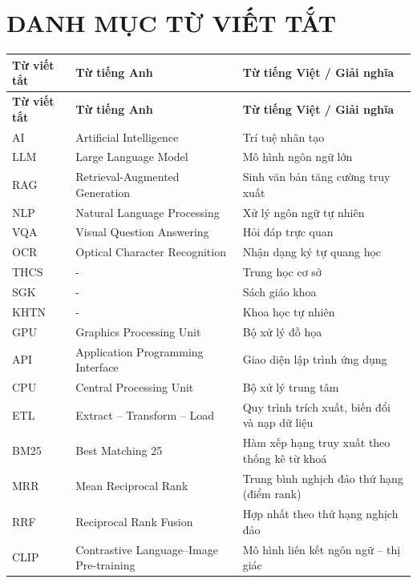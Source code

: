 \chapter*{DANH MỤC TỪ VIẾT TẮT}

\begin{longtable}{|l|l|p{7.5cm}|}
    \hline
    \textbf{Từ viết tắt} & \textbf{Từ tiếng Anh} & \textbf{Từ tiếng Việt / Giải nghĩa} \\
    \hline
    \endfirsthead
    \hline
    \textbf{Từ viết tắt} & \textbf{Từ tiếng Anh} & \textbf{Từ tiếng Việt / Giải nghĩa} \\
    \hline
    \endhead
    \hline
    \endfoot
    AI & Artificial Intelligence & Trí tuệ nhân tạo \\
    \hline
    LLM & Large Language Model & Mô hình ngôn ngữ lớn \\
    \hline
    RAG & Retrieval-Augmented Generation & Sinh văn bản tăng cường truy xuất \\
    \hline
    NLP & Natural Language Processing & Xử lý ngôn ngữ tự nhiên \\
    \hline
    VQA & Visual Question Answering & Hỏi đáp trực quan \\
    \hline
    OCR & Optical Character Recognition & Nhận dạng ký tự quang học \\
    \hline
    THCS & - & Trung học cơ sở \\
    \hline
    SGK & - & Sách giáo khoa \\
    \hline
    KHTN & - & Khoa học tự nhiên \\
    \hline
    GPU & Graphics Processing Unit & Bộ xử lý đồ họa \\
    \hline
    API & Application Programming Interface & Giao diện lập trình ứng dụng \\
    \hline
    CPU & Central Processing Unit & Bộ xử lý trung tâm \\
    \hline
    ETL & Extract -- Transform -- Load & Quy trình trích xuất, biến đổi và nạp dữ liệu \\
    \hline
    BM25 & Best Matching 25 & Hàm xếp hạng truy xuất theo thống kê từ khoá \\
    \hline
    MRR & Mean Reciprocal Rank & Trung bình nghịch đảo thứ hạng (điểm rank) \\
    \hline
    RRF & Reciprocal Rank Fusion & Hợp nhất theo thứ hạng nghịch đảo \\
    \hline
    CLIP & Contrastive Language--Image Pre-training & Mô hình liên kết ngôn ngữ -- thị giác \\

\end{longtable}
